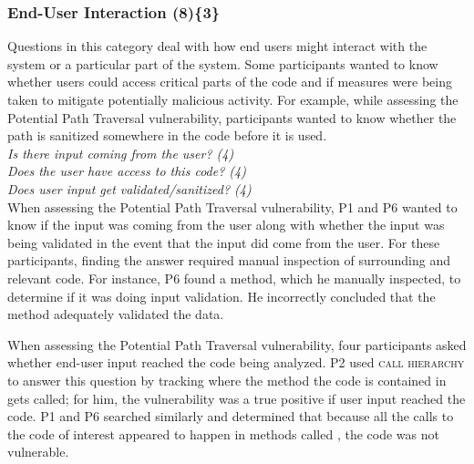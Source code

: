\documentclass[10pt,journal,compsoc]{IEEEtran}
\begin{document}



\subsubsection{End-User Interaction (8)\{3\}}

\label{eui}

Questions in this category deal with how end users might interact with the system or a particular part of the system. 
Some participants wanted to know whether users could access critical parts of the code and if measures were being taken to mitigate potentially malicious activity. 
For example, while assessing the Potential Path Traversal vulnerability, participants wanted to know whether the path is sanitized somewhere in the code before it is used.
\\

\noindent\emph{Is there input coming from the user? (4)} \\
\emph{Does the user have access to this code? (4)} \\
\emph{Does user input get validated/sanitized? (4)} 
\\

 
When assessing the Potential Path Traversal vulnerability, P1 and P6 wanted to know if the input was coming from the user along with whether the input was being validated in the event that the input did come from the user.
For these participants, finding the answer required manual inspection of surrounding and relevant code. 
For instance, P6 found a  method, which he manually inspected, to determine if it was doing input validation.
He incorrectly concluded that the  method adequately validated the data.

When assessing the Potential Path Traversal vulnerability, four participants asked whether end-user input reached the code being analyzed.
P2 used \textsc{call hierarchy} to answer this question by tracking where the method the code is contained in gets called; for him, the vulnerability was a true positive if user input reached the code.
P1 and P6 searched similarly and determined that because all the calls to the code of interest appeared to happen in methods called , the code was not vulnerable.
\end{document}
